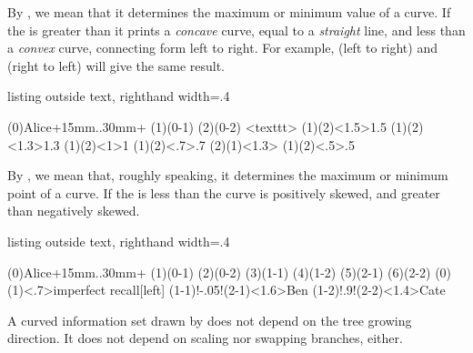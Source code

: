 \label{page:plotfactor}
By , we mean that it determines the maximum or minimum value of a curve.
If the  is greater than  it prints a \emph{concave} curve, equal to  a \emph{straight} line, and less than  a \emph{convex} curve, connecting form left to right.
For example,  (left to right) and  (right to left) will give the same result.

\begin{tcblisting}{listing outside text, righthand width=.4\linewidth}
\begin{istgame}[scale=1.5,font=\scriptsize]
\istroot(0){Alice}+15mm..30mm+
  \istb \istb \endist
\istroot(1)(0-1)  \istb \istb \endist
\istroot(2)(0-2)  \istb \istb \endist
{}<texttt>
(1)(2)<1.5>{1.5}
(1)(2)<1.3>{1.3}
(1)(2)<1>{1}
(1)(2)<.7>{.7}
(2)(1)<1.3>
(1)(2)<.5>{.5}
\end{istgame}
\end{tcblisting}


By , we mean that, roughly speaking, it determines the maximum or minimum point of a curve. If the  is less than  the curve is positively skewed, and greater than  negatively skewed.

\begin{tcblisting}{listing outside text, righthand width=.4\linewidth}
\begin{istgame}[font=\scriptsize]
\istroot(0){Alice}+15mm..30mm+
                  \istb \istb \endist
\istroot(1)(0-1)  \istb \istb \endist
\istroot(2)(0-2)  \istb \istb \endist
\xtdistance{10mm}{10mm}
\istroot(3)(1-1)  \istb \istb \endist
\istroot(4)(1-2)  \istb \istb \endist
\istroot(5)(2-1)  \istb \istb \endist
\istroot(6)(2-2)  \istb \istb \endist
\xtCInfoset(0)(1)<.7>{imperfect recall}[left]
\xtCInfoset(1-1)!-.05!(2-1)<1.6>{Ben}
\xtCInfoset(1-2)!.9!(2-2)<1.4>{Cate}
\end{istgame}
\end{tcblisting}

A curved information set drawn by \cmd{\xtCInfoset} does not depend on the tree growing direction.
It does not depend on scaling nor swapping branches, either.

